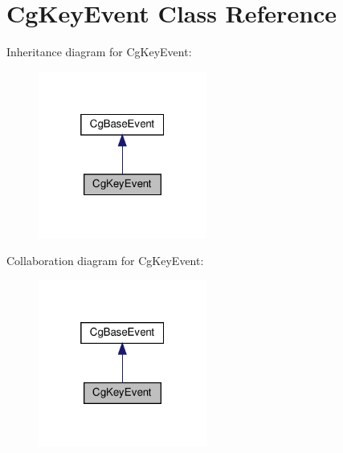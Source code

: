 \hypertarget{class_cg_key_event}{}\section{Cg\+Key\+Event Class Reference}
\label{class_cg_key_event}


Inheritance diagram for Cg\+Key\+Event\+:
\nopagebreak
\begin{figure}[H]
\begin{center}
\leavevmode
\includegraphics[width=157pt]{class_cg_key_event__inherit__graph}
\end{center}
\end{figure}


Collaboration diagram for Cg\+Key\+Event\+:
\nopagebreak
\begin{figure}[H]
\begin{center}
\leavevmode
\includegraphics[width=157pt]{class_cg_key_event__coll__graph}
\end{center}
\end{figure}
